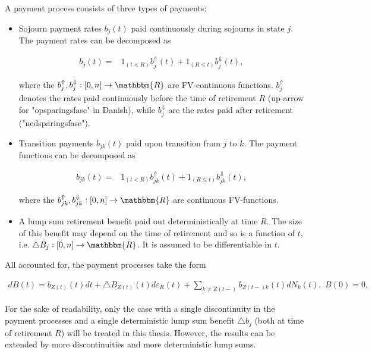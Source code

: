 \documentclass{book}
\newcommand{\1}[1]{\mathbbm{1}_{\left\lbrace #1 \right\rbrace}}
\theoremstyle{break}
\theoremstyle{remark}
\newenvironment{remark}
  {\pushQED{\qed}\renewcommand{\qedsymbol}{\scalebox{1.4}{$\circ$}}\remarkx}
  {\popQED\endremarkx}
\numberwithin{equation}{section}
\begin{document}
A payment process consists of three types of payments:

\begin{itemize}
    \item Sojourn payment rates $b_j(t)$ paid continuously during sojourns in state $j$. The payment rates can be decomposed as
    
    \begin{align*}
        b_j(t) =& 1_{\left( t<R \right)} b_j^{\Uparrow}(t) + 1_{\left( R \leq t \right)} b_j^{\Downarrow}(t),
    \end{align*}
    
    where the $b_j^{\Uparrow}, b_j^{\Downarrow}: [0,n] \to \mathbbm{R}$ are FV-continuous functions. $b_j^{\Uparrow}$ denotes the rates paid continuously before the time of retirement $R$ (up-arrow for "opsparingsfase" in Danish), while $b_j^{\Downarrow}$ are the rates paid after retirement ("nedsparingsfase").
    
    
    
    \item Transition payments $b_{jk}(t)$ paid upon transition from $j$ to $k$. The payment functions can be decomposed as
    
    \begin{align*}
        b_{jk}(t) =& 1_{\left( t<R \right)} b_{jk}^{\Uparrow}(t) + 1_{\left( R \leq t \right)} b_{jk}^{\Downarrow}(t),
    \end{align*}
    
    where the $b_{jk}^{\Uparrow}, b_{jk}^{\Downarrow}: [0,n] \to \mathbbm{R}$ are continuous FV-functions.
    
    
    
    \item A lump sum retirement benefit paid out deterministically at time $R$. The size of this benefit may depend on the time of retirement and so is a function of $t$, i.e. $\triangle B_j: [0,n] \to \mathbbm{R}$. It is assumed to be differentiable in $t$.
\end{itemize}

All accounted for, the payment processes take the form

\begin{align}
    dB(t) = b_{Z(t)}(t)dt + \triangle B_{Z(t)}(t) d \varepsilon_{R}(t) + \sum_{k \neq Z(t-)}b_{{Z(t-)}k}(t)dN_{k}(t). \, \, \, B(0) = 0, \label{PaymentProcessDef}
\end{align}

\begin{remark}
	For the sake of readability, only the case with a single discontinuity in the payment processes and a single deterministic lump sum benefit $\triangle b_j$ (both at time of retirement $R$) will be treated in this thesis. However, the results can be extended by more discontinuities and more deterministic lump sums.
\end{remark}
\end{document}
